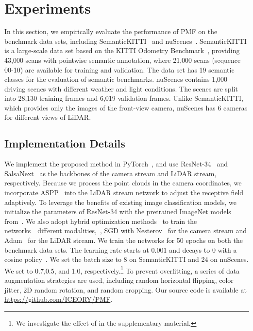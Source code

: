 \documentclass[10pt,twocolumn,letterpaper]{article}
\begin{document}
\section{Experiments}
In this section, we empirically evaluate the performance of PMF on the benchmark data sets, including SemanticKITTI~\cite{behley2019semantickitti} and nuScenes~\cite{caesar2020nuscenes}. SemanticKITTI is a large-scale data set based on the KITTI Odometry Benchmark~\cite{geiger2012we}, providing 43,000 scans with pointwise semantic annotation, where 21,000 scans (sequence 00-10) are available for training and validation. The data set has 19 semantic classes for the evaluation of semantic benchmarks. nuScenes contains 1,000 driving scenes with different weather and light conditions. The scenes are split into 28,130 training frames and 6,019 validation frames. Unlike SemanticKITTI, which provides only the images of the front-view camera, nuScenes has 6 cameras for different views of LiDAR.












\subsection{Implementation Details}
We implement the proposed method in PyTorch~\cite{paszke2019pytorch}, and use ResNet-34~\cite{he2016deep} and SalsaNext~\cite{cortinhal2020salsanext} as the  backbones of the camera stream and LiDAR stream, respectively. Because we process the point clouds in the camera coordinates, we incorporate ASPP~\cite{chen2017deeplab} into the LiDAR stream network to adjust the receptive field adaptively. To leverage the benefits of existing image classification models, we initialize the parameters of ResNet-34 with the pretrained ImageNet models from~\cite{paszke2019pytorch}. We also adopt hybrid optimization methods~\cite{zhang2020multi} to train the networks~\wrt~different modalities,~\ie, SGD with Nesterov~\cite{nesterov1983method} for the camera stream and Adam~\cite{kingma2014adam} for the LiDAR stream. We train the networks for 50 epochs on both the benchmark data sets. The learning rate starts at 0.001 and decays to 0 with a cosine policy~\cite{loshchilov2016sgdr}. We set the batch size to 8 on SemanticKITTI and 24 on nuScenes. We set  to 0.7,0.5, and 1.0, respectively.\footnote{We investigate the effect of  in the supplementary material.}
To prevent overfitting, a series of data augmentation strategies are used, including random horizontal flipping, color jitter, 2D random rotation, and random cropping. Our source code is available at \url{https://github.com/ICEORY/PMF}.
\end{document}
